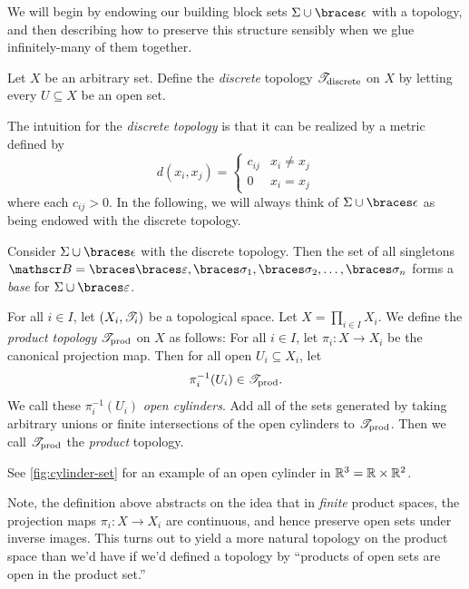 \documentclass{fkpaper}
\begin{document}
\begin{multicols}{2}
  We will begin by endowing our building block sets $\Sigma \cup
  \set{\epsilon}$ with a topology, and then describing how to preserve
  this structure sensibly when we glue infinitely-many of them together.
  \begin{definition}
    Let $X$ be an arbitrary set. Define the \emph{discrete} topology
    ${\mathscr{T}}_{\rm discrete}$ on $X$ by letting every $U \subseteq X$ be an
    open set.
  \end{definition}
  The intuition for the \emph{discrete topology} is that it can be
  realized by a metric defined by
  \[
    d(x_i, x_j) =
    \begin{cases}
      c_{ij} & x_i \neq x_j \\
      0 & x_i = x_j
    \end{cases}
  \]
  where each $c_{ij} > 0$. In the following, we will always think of
  $\Sigma \cup \set{\epsilon}$ as being endowed with the discrete
  topology.
  \begin{proposition}\label{prop:basis-for-strings}
    Consider $\Sigma \cup \set{\epsilon}$ with the discrete topology.
    Then the set of all singletons $\ms B = \set{\set{\varepsilon},
      \set{\sigma_1}, \set{\sigma_2}, \ldots, \set{\sigma_n}}$ forms a
    \emph{base} for $\Sigma \cup \set{\varepsilon}$.
  \end{proposition}

  \begin{definition}
    For all $i \in I$, let $(X_i, {\mathscr{T}}_i)$ be a topological space. Let
    $X = \prod_{i \in I} X_i$. We define the \emph{product topology}
    ${\mathscr{T}}_{\rm prod}$ on $X$ as follows: For all $i \in I$, let $\pi_i
    : X \to X_i$ be the canonical projection map. Then for all open $U_i
    \subseteq X_i$, let
    \[
      \pi_i^{-1}(U_i) \in {\mathscr{T}}_{\rm prod}.
    \]
    We call these $\pi_i^{-1}(U_i)$ \emph{open cylinders}. Add all of
    the sets generated by taking arbitrary unions or finite
    intersections of the open cylinders to ${\mathscr{T}}_{\rm prod}$. Then we
    call ${\mathscr{T}}_{\rm prod}$ the \emph{product} topology. \qedhere
  \end{definition}
  See \cref{fig:cylinder-set} for an example of an open cylinder in
  $\mathbb{R}^3 = \mathbb{R} \times \mathbb{R}^2$.

  Note, the definition above abstracts on the idea that in \emph{finite}
  product spaces, the projection maps $\pi_i : X \to X_i$ are
  continuous, and hence preserve open sets under inverse images. This
  turns out to yield a more natural topology on the product space than
  we'd have if we'd defined a topology by ``products of open sets are
  open in the product set.''


\end{multicols}
\end{document}
